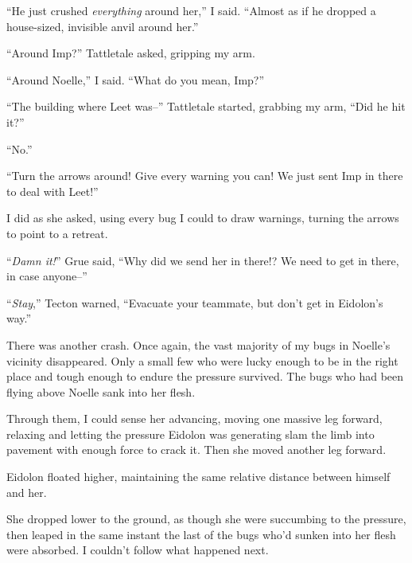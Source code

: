``He just crushed \emph{everything} around her,'' I said.  ``Almost as if he dropped a house-sized, invisible anvil around her.''



``Around Imp?''  Tattletale asked, gripping my arm.



``Around Noelle,'' I said.  ``What do you mean, Imp?''



``The building where Leet was--'' Tattletale started, grabbing my arm, ``Did he hit it?''



``No.''



``Turn the arrows around!  Give every warning you can!  We just sent Imp in there to deal with Leet!''



I did as she asked, using every bug I could to draw warnings, turning the arrows to point to a retreat.



``\emph{Damn it!}'' Grue said, ``Why did we send her in there!?  We need to get in there, in case anyone--''



``\emph{Stay},'' Tecton warned, ``Evacuate your teammate, but don't get in Eidolon's way.''



There was another crash.  Once again, the vast majority of my bugs in Noelle's vicinity disappeared.  Only a small few who were lucky enough to be in the right place and tough enough to endure the pressure survived.  The bugs who had been flying above Noelle sank into her flesh.



Through them, I could sense her advancing, moving one massive leg forward, relaxing and letting the pressure Eidolon was generating slam the limb into pavement with enough force to crack it.  Then she moved another leg forward.



Eidolon floated higher, maintaining the same relative distance between himself and her.



She dropped lower to the ground, as though she were succumbing to the pressure, then leaped in the same instant the last of the bugs who'd sunken into her flesh were absorbed.  I couldn't follow what happened next.



